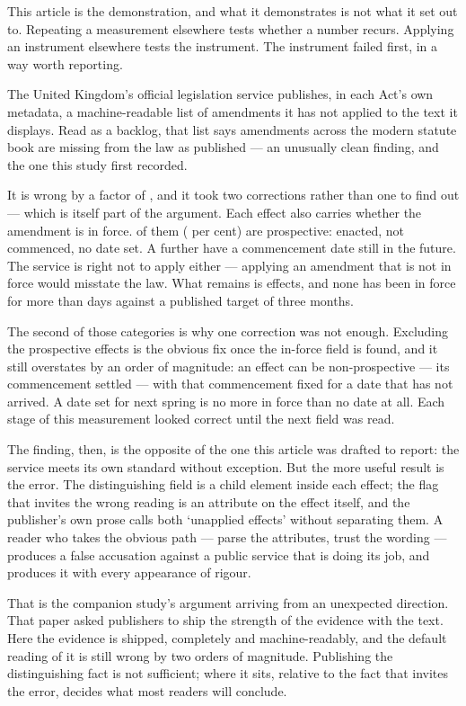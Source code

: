 \documentclass[11pt]{article}
\begin{document}
This article is the demonstration, and what it demonstrates is not what it set
out to. Repeating a measurement elsewhere tests whether a number recurs.
Applying an instrument elsewhere tests the instrument. The instrument failed
first, in a way worth reporting.

The United Kingdom's official legislation service publishes, in each Act's own
metadata, a machine-readable list of amendments it has not applied to the text
it displays. Read as a backlog, that list says \nFlagged{} amendments across the
modern statute book are missing from the law as published --- an unusually
clean finding, and the one this study first recorded.

It is wrong by a factor of \nOverstatementFactor, and it took two corrections
rather than one to find out --- which is itself part of the argument. Each
effect also carries whether the amendment is in force. \nProspective{} of them
(\nProspectiveShare{} per cent) are prospective: enacted, not commenced, no
date set. A further \nScheduled{} have a commencement date still in the future.
The service is right not to apply either --- applying an amendment that is not
in force would misstate the law. What remains is \nInForceNow{} effects, and
none has been in force for more than \nLongestDays{} days against a published
target of three months.

The second of those categories is why one correction was not enough. Excluding
the prospective effects is the obvious fix once the in-force field is found, and
it still overstates by an order of magnitude: an effect can be non-prospective
--- its commencement settled --- with that commencement fixed for a date that
has not arrived. A date set for next spring is no more in force than no date at
all. Each stage of this measurement looked correct until the next field was
read.

The finding, then, is the opposite of the one this article was drafted to
report: the service meets its own standard without exception. But the more
useful result is the error. The distinguishing field is a child element inside
each effect; the flag that invites the wrong reading is an attribute on the
effect itself, and the publisher's own prose calls both `unapplied effects'
without separating them. A reader who takes the obvious path --- parse the
attributes, trust the wording --- produces a false accusation against a public
service that is doing its job, and produces it with every appearance of rigour.

That is the companion study's argument arriving from an unexpected direction.
That paper asked publishers to ship the strength of the evidence with the text.
Here the evidence is shipped, completely and machine-readably, and the default
reading of it is still wrong by two orders of magnitude. Publishing the
distinguishing fact is not sufficient; where it sits, relative to the fact that
invites the error, decides what most readers will conclude.
\end{document}
